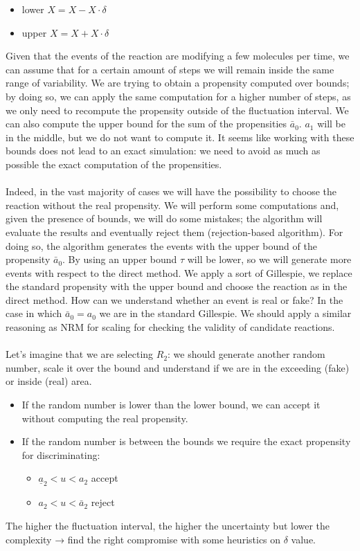 \begin{itemize}
  \item lower $X = X - X \cdot \delta$ \item upper $X = X + X \cdot \delta$
\end{itemize}

\noindent
Given that the events of the reaction are modifying a few molecules per time, we can assume that for a certain amount of steps we will remain inside the same range of variability.
We are trying to obtain a propensity computed over bounds; by doing so, we can apply the same computation for a higher number of steps, as we only need to recompute the propensity outside of the fluctuation interval.
We can also compute the upper bound for the sum of the propensities $\bar{a}_0$.
$a_1$ will be in the middle, but we do not want to compute it.
It seems like working with these bounds does not lead to an exact simulation: we need to avoid as much as possible the exact computation of the propensities.
\\
\\
\noindent
Indeed, in the vast majority of cases we will have the possibility to choose the reaction without the real propensity.
We will perform some computations and, given the presence of bounds, we will do some mistakes; the algorithm will evaluate the results and eventually reject them (rejection-based algorithm).
For doing so, the algorithm generates the events with the upper bound of the propensity $\bar{a}_0$.
By using an upper bound $\tau$ will be lower, so we will generate more events with respect to the direct method.
We apply a sort of Gillespie, we replace the standard propensity with the upper bound and choose the reaction as in the direct method.
How can we understand whether an event is real or fake? In the case in which $\bar{a}_0 = a_0$ we are in the standard Gillespie.
We should apply a similar reasoning as NRM for scaling for checking the validity of candidate reactions.
\\
\\
\noindent
Let's imagine that we are selecting $R_2$: we should generate another random number, scale it over the bound and understand if we are in the exceeding (fake) or inside (real) area.

\begin{itemize}
  \item If the random number is lower than the lower bound, we can accept it without computing the real propensity.
  \item If the random number is between the bounds we require the exact propensity for discriminating:

  \begin{itemize}
    \item $\underline{a}_2 < u < a_2$ accept \item $a_2 < u < \bar{a}_2$ reject
  \end{itemize}

\end{itemize}

\noindent
The higher the fluctuation interval, the higher the uncertainty but lower the complexity → find the right compromise with some heuristics on $\delta$ value.
